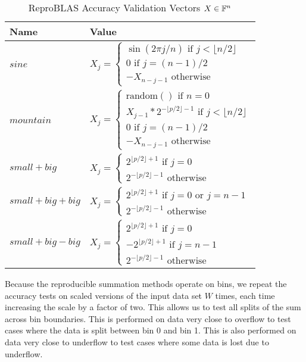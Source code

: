     \begin{table}[!htbp]
        \centering
        \begin{tabular}{ | l |  l |} \hline
            Name & Value\\ \hline
            $sine$ & $X_j = \begin{cases}\sin(2 \pi j/n) \text{ if } j < \lfloor n/2 \rfloor\\ 0 \text{ if } j = (n - 1)/2 \\ -X_{n - j - 1} \text{ otherwise } \end{cases}$ \\ \hline
            $mountain$ & $X_j = \begin{cases}\text{random}()\text{ if } n = 0 \\ X_{j - 1} * 2^{-\lfloor p/2\rfloor - 1} \text{ if } j < \lfloor n/2 \rfloor\\ 0 \text{ if } j = (n - 1)/2 \\ -X_{n - j - 1} \text{ otherwise } \end{cases}$ \\ \hline
            $small + big$ & $X_j = \begin{cases} 2^{\lfloor p/2\rfloor + 1} \text{ if } j = 0 \\ 2^{-\lfloor p/2\rfloor - 1} \text{ otherwise} \end{cases}$ \\ \hline
            $small + big + big$ & $X_j = \begin{cases} 2^{\lfloor p/2\rfloor + 1} \text{ if } j = 0 \text{ or } j = n - 1 \\ 2^{-\lfloor p/2\rfloor - 1} \text{ otherwise} \end{cases}$\\ \hline
            $small + big - big$ & $X_j = \begin{cases} 2^{\lfloor p/2\rfloor + 1} \text{ if } j = 0\\-2^{\lfloor p/2\rfloor + 1} \text{ if } j = n - 1\\ 2^{-\lfloor p/2\rfloor - 1} \text{ otherwise} \end{cases}$\\ \hline
        \end{tabular}
        \caption{ReproBLAS Accuracy Validation Vectors $X \in \mathbb{F}^n$}
        \label{tbl:validateblas1data}
    \end{table}

  Because the reproducible summation methods operate on bins, we repeat the accuracy tests on scaled versions of the input data set $W$ times, each time increasing the scale by a factor of two. This allows us to test all splits of the sum across bin boundaries. This is performed on data very close to overflow to test cases where the data is split between bin 0 and bin 1. This is also performed on data very close to underflow to test cases where some data is lost due to underflow.

